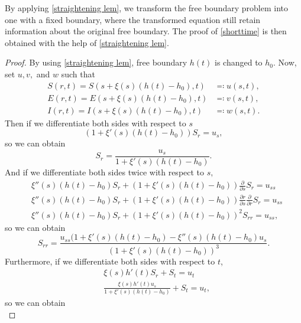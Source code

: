 \documentclass[11pt]{amsart}
\numberwithin{equation}{section}
\theoremstyle{plain}
\theoremstyle{definition}
\begin{document}
By applying \cref{straightening lem}, we transform the free boundary problem into one with a fixed boundary, where the transformed equation still retain information about the original free boundary. The proof of \cref{shorttime} is then obtained with the help of \cref{straightening lem}.
	\begin{proof}
		By using \cref{straightening lem}, free boundary $h(t)$ is changed to $h_0$. Now, set $u,v,$ and $w$ such that
		\begin{align*}
			S(r,t)=S(s+\xi(s)(h(t)-h_0),t) &\eqqcolon u(s,t),
			\\
			E(r,t)=E(s+\xi(s)(h(t)-h_0),t) &\eqqcolon v(s,t),
			\\
			I(r,t)=I(s+\xi(s)(h(t)-h_0),t) &\eqqcolon w(s,t).
		\end{align*}
		Then if we differentiate both sides with respect to $s$
		\begin{equation*}
				(1+\xi'(s)(h(t)-h_0))S_r=u_s,
		\end{equation*}
		so we can obtain
		\begin{equation*}
			S_r=\frac{u_s}{1+\xi'(s)(h(t)-h_0)}.
		\end{equation*}
		And if we differentiate both sides twice with respect to $s,$
		\begin{equation*}
			\begin{aligned}
			&\xi''(s)(h(t)-h_0)S_r+(1+\xi'(s)(h(t)-h_0))\frac{\partial}{\partial s}S_r=u_{ss}
			\\
			&\xi''(s)(h(t)-h_0)S_r+(1+\xi'(s)(h(t)-h_0))\frac{\partial r}{\partial s}\frac{\partial}{\partial r}S_r=u_{ss}
			\\
			&\xi''(s)(h(t)-h_0)S_r+(1+\xi'(s)(h(t)-h_0))^2S_{rr}=u_{ss}, 
			\end{aligned}
		\end{equation*}
		so we can obtain
		\begin{equation*}
			S_{rr}=\frac{u_{ss}(1+\xi'(s)(h(t)-h_0)-\xi''(s)(h(t)-h_0)u_s}{(1+\xi'(s)(h(t)-h_0))^3}.
		\end{equation*}
		Furthermore, if we differentiate both sides with respect to $t$,
		\begin{equation*}
			\begin{aligned}
				&\xi(s)h'(t)S_r+S_t=u_t
				\\
				&\frac{\xi(s)h'(t)u_s}{1+\xi'(s)(h(t)-h_0)}+S_t=u_t,
			\end{aligned}
		\end{equation*}
		so we can obtain
		\begin{equation*}

\end{equation*}
\end{proof}
\end{document}
